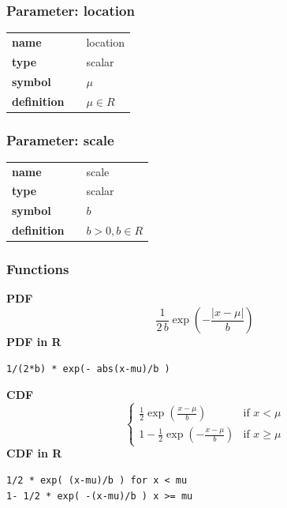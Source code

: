 \subsubsection*{Parameter: location}

\noindent\begin{tabular}{p{2cm}cl}
\textbf{name} & & location \\
\textbf{type} & & scalar \\
\textbf{symbol} & & $\mu$  \\
\textbf{definition} & & $\mu \in R$
\end{tabular}
\subsubsection*{Parameter: scale}

\noindent\begin{tabular}{p{2cm}cl}
\textbf{name} & & scale \\
\textbf{type} & & scalar \\
\textbf{symbol} & & $b$  \\
\textbf{definition} & & $b > 0, b \in R$
\end{tabular}
\subsubsection*{Functions}

\smallskip \noindent \hspace{.2cm} \textbf{PDF} 
\begin{equation*}\frac{1}{2\,b} \exp \left(-\frac{|x-\mu|}b \right)\end{equation*}
\smallskip \noindent \hspace{.2cm} \textbf{PDF in R}  
\begin{verbatim}1/(2*b) * exp(- abs(x-mu)/b )\end{verbatim}
\smallskip \noindent \hspace{.2cm} \textbf{CDF} 
\begin{equation*}\begin{cases}
      \frac12 \exp \left( \frac{x-\mu}{b} \right) & \mbox{if }x < \mu \\
          1-\frac12 \exp \left( -\frac{x-\mu}{b} \right) & \mbox{if }x \geq \mu
       \end{cases}\end{equation*}
\smallskip \noindent \hspace{.2cm} \textbf{CDF in R} 
\begin{verbatim}1/2 * exp( (x-mu)/b ) for x < mu
1- 1/2 * exp( -(x-mu)/b ) x >= mu\end{verbatim}
\smallskip
